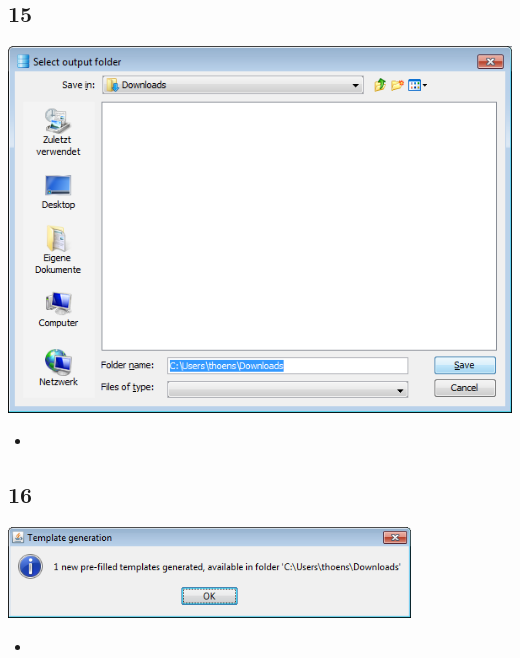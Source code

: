 \documentclass{beamer}
\begin{document}
\subsection{15}
\begin{frame}
	\begin{center}
  		\includegraphics[height=0.5\textheight]{15.png}
	\end{center}
	\begin{itemize}
		\item
	\end{itemize}
\end{frame}

\subsection{16}
\begin{frame}
	\begin{center}
  		\includegraphics[width=0.8\textwidth]{16.png}
	\end{center}
	\begin{itemize}
		\item
	\end{itemize}
\end{frame}
\end{document}
